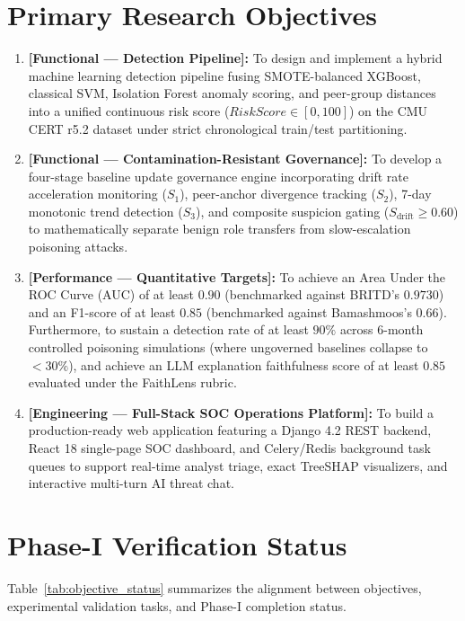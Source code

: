 \documentclass[12pt,a4paper]{report}
\begin{document}
\section{Primary Research Objectives}
\begin{enumerate}[label=\textbf{O\arabic*:}]
    \item \textbf{[Functional --- Detection Pipeline]:} To design and implement a hybrid machine learning detection pipeline fusing SMOTE-balanced XGBoost, classical SVM, Isolation Forest anomaly scoring, and peer-group distances into a unified continuous risk score ($RiskScore \in [0, 100]$) on the CMU CERT r5.2 dataset under strict chronological train/test partitioning.
    
    \item \textbf{[Functional --- Contamination-Resistant Governance]:} To develop a four-stage baseline update governance engine incorporating drift rate acceleration monitoring ($S_1$), peer-anchor divergence tracking ($S_2$), 7-day monotonic trend detection ($S_3$), and composite suspicion gating ($S_{\text{drift}} \ge 0.60$) to mathematically separate benign role transfers from slow-escalation poisoning attacks.
    
    \item \textbf{[Performance --- Quantitative Targets]:} To achieve an Area Under the ROC Curve (AUC) of at least $0.90$ (benchmarked against BRITD's $0.9730$) and an F1-score of at least $0.85$ (benchmarked against Bamashmoos's $0.66$). Furthermore, to sustain a detection rate of at least $90\%$ across 6-month controlled poisoning simulations (where ungoverned baselines collapse to $<30\%$), and achieve an LLM explanation faithfulness score of at least $0.85$ evaluated under the FaithLens rubric.
    
    \item \textbf{[Engineering --- Full-Stack SOC Operations Platform]:} To build a production-ready web application featuring a Django 4.2 REST backend, React 18 single-page SOC dashboard, and Celery/Redis background task queues to support real-time analyst triage, exact TreeSHAP visualizers, and interactive multi-turn AI threat chat.
\end{enumerate}

\section{Phase-I Verification Status}
Table~\ref{tab:objective_status} summarizes the alignment between objectives, experimental validation tasks, and Phase-I completion status.
\end{document}
